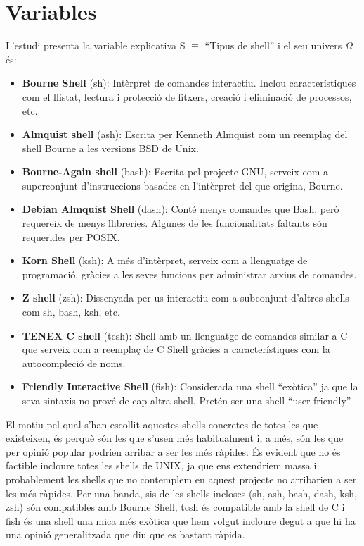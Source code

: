 \documentclass[12pt]{article}
\begin{document}
\section{Variables}
L'estudi presenta la variable explicativa S $\equiv$ ``Tipus de shell'' i el seu univers $\Omega$ és:
\begin{itemize}
  \item \textbf{Bourne Shell} (sh): Intèrpret de comandes interactiu. Inclou característiques com 
    el llistat, lectura i protecció de fitxers, creació i eliminació de processos, etc.
  \item \textbf{Almquist shell} (ash): Escrita per Kenneth Almquist com un reemplaç del shell Bourne 
    a les versions BSD de Unix.
  \item \textbf{Bourne-Again shell} (bash): Escrita pel projecte GNU, serveix com a superconjunt 
    d’instruccions basades en l’intèrpret del que origina, Bourne.
  \item \textbf{Debian Almquist Shell} (dash): Conté menys comandes que Bash, però requereix de 
    menys llibreries. Algunes de les funcionalitats faltants són requerides per POSIX. 
  \item \textbf{Korn Shell} (ksh): A més d’intèrpret, serveix com a llenguatge de programació, 
    gràcies a les seves funcions per administrar arxius de comandes. 
  \item \textbf{Z shell} (zsh): Dissenyada per us interactiu com a subconjunt d’altres shells com 
    sh, bash, ksh, etc.
  \item \textbf{TENEX C shell} (tcsh): Shell amb un llenguatge de comandes similar a C que serveix 
    com a reemplaç de C Shell gràcies a característiques com la autocompleció de noms.
  \item \textbf{Friendly Interactive Shell} (fish): Considerada una shell “exòtica” ja que la 
    seva sintaxis no prové de cap altra shell. Pretén ser una shell “user-friendly”.
\end{itemize}
El motiu pel qual s'han escollit aquestes shells concretes de totes les que existeixen, és perquè són
les que s'usen més habitualment i, a més, són les que per opinió popular podrien arribar a ser les més 
ràpides. És evident que no és factible incloure totes les shells de UNIX, ja que ens extendriem massa
i probablement les shells que no contemplem en aquest projecte no arribarien a ser les més ràpides. Per
una banda, sis de les shells incloses (sh, ash, bash, dash, ksh, zsh) són compatibles amb Bourne Shell,
tcsh és compatible amb la shell de C i fish és una shell una mica més exòtica que hem volgut incloure
degut a que hi ha una opinió generalitzada que diu que es bastant ràpida.\\
\end{document}
